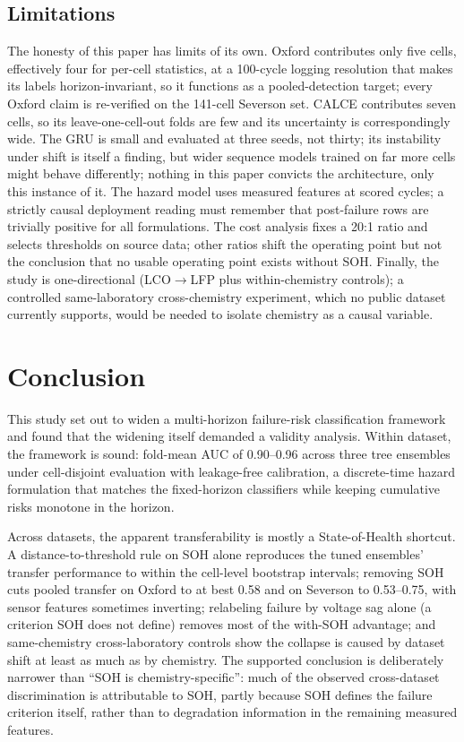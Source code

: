 \documentclass[IJPHM, 2014, 00]{PHMSociety}
\begin{document}
\subsection{Limitations}
The honesty of this paper has limits of its own. Oxford contributes only five cells, effectively four for per-cell statistics, at a 100-cycle logging resolution that makes its labels horizon-invariant, so it functions as a pooled-detection target; every Oxford claim is re-verified on the 141-cell Severson set. CALCE contributes seven cells, so its leave-one-cell-out folds are few and its uncertainty is correspondingly wide. The GRU is small and evaluated at three seeds, not thirty; its instability under shift is itself a finding, but wider sequence models trained on far more cells might behave differently; nothing in this paper convicts the architecture, only this instance of it. The hazard model uses measured features at scored cycles; a strictly causal deployment reading must remember that post-failure rows are trivially positive for all formulations. The cost analysis fixes a 20:1 ratio and selects thresholds on source data; other ratios shift the operating point but not the conclusion that no usable operating point exists without SOH. Finally, the study is one-directional (LCO$\to$LFP plus within-chemistry controls); a controlled same-laboratory cross-chemistry experiment, which no public dataset currently supports, would be needed to isolate chemistry as a causal variable.

\section{Conclusion}
This study set out to widen a multi-horizon failure-risk classification framework and found that the widening itself demanded a validity analysis. Within dataset, the framework is sound: fold-mean AUC of 0.90--0.96 across three tree ensembles under cell-disjoint evaluation with leakage-free calibration, a discrete-time hazard formulation that matches the fixed-horizon classifiers while keeping cumulative risks monotone in the horizon.

Across datasets, the apparent transferability is mostly a State-of-Health shortcut. A distance-to-threshold rule on SOH alone reproduces the tuned ensembles' transfer performance to within the cell-level bootstrap intervals; removing SOH cuts pooled transfer on Oxford to at best 0.58 and on Severson to 0.53--0.75, with sensor features sometimes inverting; relabeling failure by voltage sag alone (a criterion SOH does not define) removes most of the with-SOH advantage; and same-chemistry cross-laboratory controls show the collapse is caused by dataset shift at least as much as by chemistry. The supported conclusion is deliberately narrower than ``SOH is chemistry-specific'': much of the observed cross-dataset discrimination is attributable to SOH, partly because SOH defines the failure criterion itself, rather than to degradation information in the remaining measured features.
\end{document}
